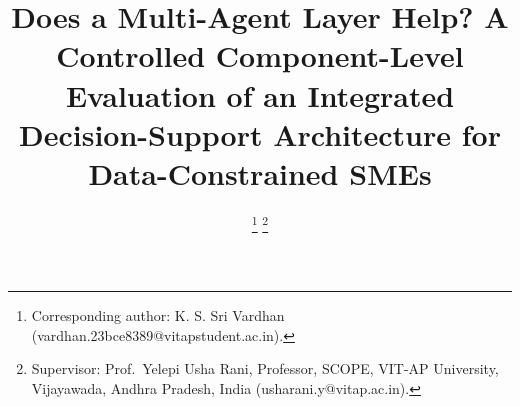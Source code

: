 \documentclass[conference]{IEEEtran}
\begin{document}
\title{Does a Multi-Agent Layer Help? A Controlled Component-Level Evaluation of
an Integrated Decision-Support Architecture for Data-Constrained SMEs}

\author{%
\thanks{Corresponding author: K. S. Sri Vardhan
(vardhan.23bce8389@vitapstudent.ac.in).}
\thanks{Supervisor: Prof.\ Yelepi Usha Rani, Professor, SCOPE, VIT-AP
University, Vijayawada, Andhra Pradesh, India (usharani.y@vitap.ac.in).}
}

\maketitle
\end{document}
